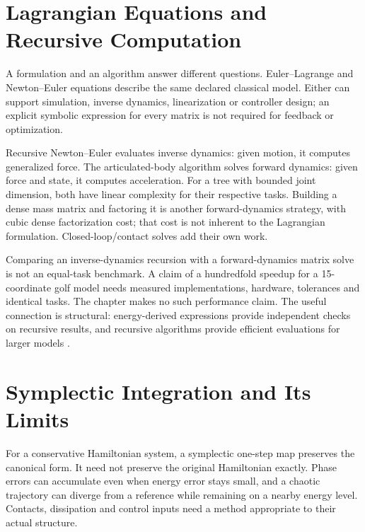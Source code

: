\section{Lagrangian Equations and Recursive Computation}
\label{sec:lagrangian_algorithms}

A formulation and an algorithm answer different questions. Euler--Lagrange and Newton--Euler equations describe the same declared classical model. Either can support simulation, inverse dynamics, linearization or controller design; an explicit symbolic expression for every matrix is not required for feedback or optimization.

Recursive Newton--Euler evaluates inverse dynamics: given motion, it computes generalized force. The articulated-body algorithm solves forward dynamics: given force and state, it computes acceleration. For a tree with bounded joint dimension, both have linear complexity for their respective tasks. Building a dense mass matrix and factoring it is another forward-dynamics strategy, with cubic dense factorization cost; that cost is not inherent to the Lagrangian formulation. Closed-loop/contact solves add their own work.

Comparing an inverse-dynamics recursion with a forward-dynamics matrix solve is not an equal-task benchmark. A claim of a hundredfold speedup for a 15-coordinate golf model needs measured implementations, hardware, tolerances and identical tasks. The chapter makes no such performance claim. The useful connection is structural: energy-derived expressions provide independent checks on recursive results, and recursive algorithms provide efficient evaluations for larger models \cite{Featherstone2008}.

\section{Symplectic Integration and Its Limits}
\label{sec:symplectic_integrators}
\label{laymans:symplectic_robotics}

For a conservative Hamiltonian system, a symplectic one-step map preserves the canonical form. It need not preserve the original Hamiltonian exactly. Phase errors can accumulate even when energy error stays small, and a chaotic trajectory can diverge from a reference while remaining on a nearby energy level. Contacts, dissipation and control inputs need a method appropriate to their actual structure.

